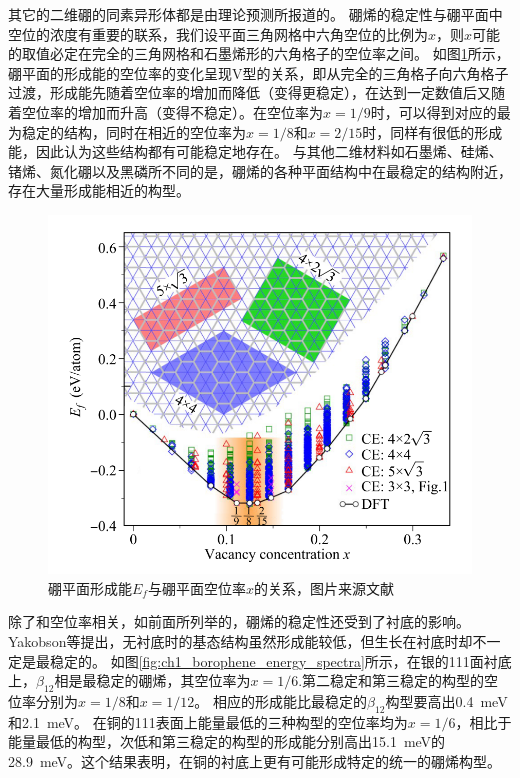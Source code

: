 其它的二维硼的同素异形体都是由理论预测所报道的\cite{liu2018intermixing, liu2013probing, penev2012polymorphism, zhang2017elasticity, zhao2016superconductivity, yang2008ab, zhang2016polyphony, tsafack2016thermomechanical, zhang2016substrate, ma2016graphene}。
硼烯的稳定性与硼平面中空位的浓度有重要的联系，我们设平面三角网格中六角空位的比例为$x$，则$x$可能的取值必定在完全的三角网格和石墨烯形的六角格子的空位率之间。
如图\ref{fig:ch1_formation_boronphenes}所示，硼平面的形成能的空位率的变化呈现V型的关系，即从完全的三角格子向六角格子过渡，形成能先随着空位率的增加而降低（变得更稳定），在达到一定数值后又随着空位率的增加而升高（变得不稳定）。在空位率为$x=1/9$时\cite{penev2012polymorphism}，可以得到对应的最为稳定的结构，同时在相近的空位率为$x=1/8$和$x=2/15$时，同样有很低的形成能，因此认为这些结构都有可能稳定地存在。
与其他二维材料如石墨烯、硅烯、锗烯、氮化硼以及黑磷所不同的是，硼烯的各种平面结构中在最稳定的结构附近，存在大量形成能相近的构型。

\begin{figure}[bt]
  \includegraphics[width=1.0\textwidth]{figs/ch1_formation_boronphenes.png}
  \centering
  \caption{硼平面形成能$E_f$与硼平面空位率$x$的关系，图片来源文献\cite{penev2012polymorphism}}
  \label{fig:ch1_formation_boronphenes}
\end{figure}

除了和空位率相关，如前面所列举的，硼烯的稳定性还受到了衬底的影响。
Yakobson等提出\cite{zhang2015two}，无衬底时的基态结构虽然形成能较低，但生长在衬底时却不一定是最稳定的。
如图\ref{fig:ch1_borophene_energy_spectra}所示，在银的111面衬底上，$\beta_{12}$相是最稳定的硼烯，其空位率为$x=1/6$.第二稳定和第三稳定的构型的空位率分别为$x=1/8$和$x=1/12$。
相应的形成能比最稳定的$\beta_{12}$构型要高出\SI{0.4}{\meV}和\SI{2.1}{\meV}。
在铜的111表面上能量最低的三种构型的空位率均为$x=1/6$，相比于能量最低的构型，次低和第三稳定的构型的形成能分别高出\SI{15.1}{\meV}的\SI{28.9}{\meV}\cite{zhang2015two}。这个结果表明，在铜的衬底上更有可能形成特定的统一的硼烯构型。

